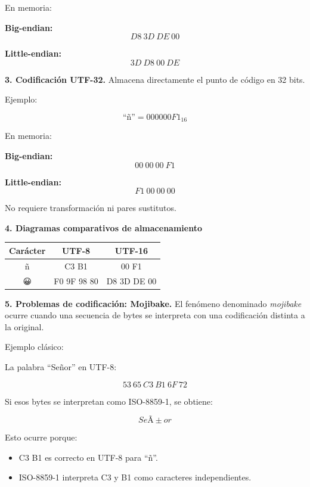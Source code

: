 \documentclass[12pt,twoside]{book}
\begin{document}
				En memoria:
				
				\textbf{Big-endian:}
				\[
				D8\ 3D\ DE\ 00
				\]
				
				\textbf{Little-endian:}
				\[
				3D\ D8\ 00\ DE
				\]
				
				\noindent
				\textbf{3. Codificación UTF-32.} Almacena directamente el punto de código en 32 bits.
				
				Ejemplo:
				
				\[
				\text{``ñ''} = 000000F1_{16}
				\]
				
				En memoria:
				
				\textbf{Big-endian:}
				\[
				00\ 00\ 00\ F1
				\]
				
				\textbf{Little-endian:}
				\[
				F1\ 00\ 00\ 00
				\]
				
				No requiere transformación ni pares sustitutos.
				
				\noindent
				\textbf{4. Diagramas comparativos de almacenamiento}
				
				\begin{center}
					\begin{tabular}{ c c c }
						\hline
						Carácter & UTF-8 & UTF-16 \\
						\hline
						ñ & C3 B1 & 00 F1 \\
						😀 & F0 9F 98 80 & D8 3D DE 00 \\
						\hline
					\end{tabular}
				\end{center}
				
				\noindent
				\textbf{5. Problemas de codificación: Mojibake.} El fenómeno denominado \textit{mojibake} ocurre cuando una secuencia de bytes se interpreta con una codificación distinta a la original.
				
				Ejemplo clásico:
				
				La palabra ``Señor'' en UTF-8:
				
				\[
				53\ 65\ C3\ B1\ 6F\ 72
				\]
				
				Si esos bytes se interpretan como ISO-8859-1, se obtiene:
				
				\[
				SeÃ±or
				\]
				
				Esto ocurre porque:
				
				\begin{itemize}
					\item C3 B1 es correcto en UTF-8 para ``ñ''.
					\item ISO-8859-1 interpreta C3 y B1 como caracteres independientes.
				\end{itemize}
				
\end{document}
